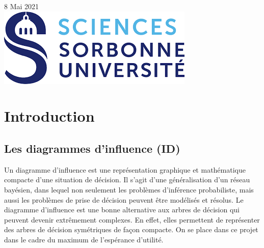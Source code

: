 \documentclass[12pt]{article}
\begin{document}
\begin{titlepage}


{\large 8 Mai 2021}\\[2cm] %


\includegraphics[scale=0.5]{logo.png}\\[1cm] %
 

\vfill %

\end{titlepage}

\renewcommand{\contentsname}{Table des Matières}
\pagebreak
\tableofcontents
\pagebreak

\section{Introduction}

\subsection{Les diagrammes d'influence (ID)}
Un diagramme d'influence est une représentation graphique et mathématique compacte d'une situation de décision. Il s'agit d'une généralisation d'un réseau bayésien, dans lequel non seulement les problèmes d'inférence probabiliste, mais aussi les problèmes de prise de décision peuvent être modélisés et résolus. 
Le diagramme d'influence est une bonne alternative aux arbres de décision qui peuvent devenir extrêmement complexes. En effet, elles permettent de représenter des arbres de décision symétriques de façon compacte. On se place dans ce projet dans le cadre du maximum de l'espérance d'utilité.
\end{document}
